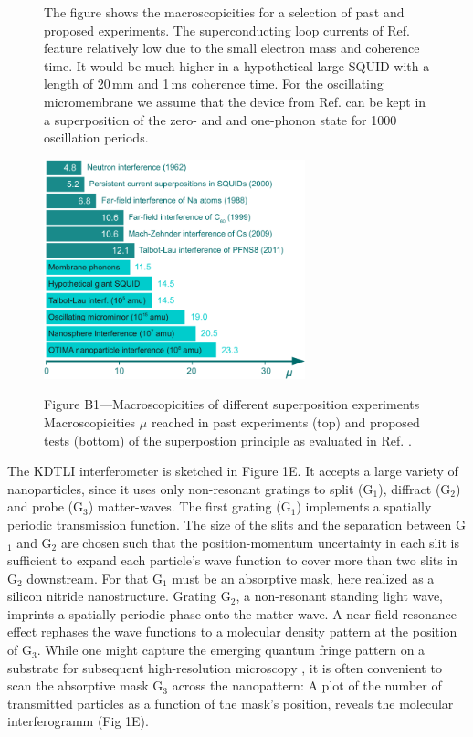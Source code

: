 \documentclass[12pt]{article}
\begin{document}
\begin{figure}
\begin{framed}
\hspace{1.5em}The figure shows the macroscopicities for a selection of past and proposed experiments. The superconducting loop currents of Ref.  feature relatively low
due to the small electron mass and coherence time. It would be much higher in a hypothetical large SQUID with a length of 20\,mm and 1\,ms coherence time. For the oscillating micromembrane we assume that the device from Ref.  can be kept in a superposition of the zero- and  and one-phonon state for 1000 oscillation periods.

\centerline{
\includegraphics[height=2.5in]{FigB.pdf}}
{\small\noindent
{Figure B1---Macroscopicities of different superposition experiments}
Macroscopicities $\mu$ reached in past experiments (top) and proposed tests (bottom) of the superpostion principle  as evaluated in Ref. .
}
\end{framed}
\end{figure}


The KDTLI interferometer is sketched in Figure 1E. It accepts a large variety of nanoparticles,
since it uses only non-resonant gratings to split (G$_1$), 
diffract (G$_2$) and probe (G$_3$) matter-waves.
The first grating (G$_1$) implements a spatially periodic transmission function. 
The size of the slits and the separation between G$_1$ and G$_2$ are chosen such that the position-momentum uncertainty in each
slit is sufficient to expand each particle's wave function to cover more than two slits
in G$_2$ downstream. For that G$_1$ must be an absorptive mask, here realized as a silicon nitride nanostructure.
Grating G$_2$, a non-resonant standing light wave, imprints a spatially periodic phase onto the matter-wave.
A near-field resonance effect rephases the wave functions to a molecular density pattern at the position of G$_3$.
While one might capture the emerging quantum fringe pattern on a substrate for subsequent high-resolution microscopy \cite{Juffmann2009, Juffmann2012a},
it is often convenient to scan the absorptive mask G$_3$ across the nanopattern: 
A plot of the number of transmitted particles as a function of the mask's position, reveals the molecular interferogramm (Fig 1E).
\end{document}
